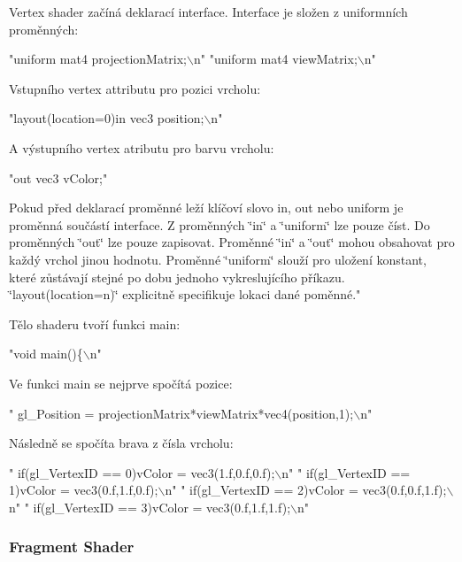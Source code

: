 Vertex shader začíná deklarací interface. Interface je složen z uniformních proměnných\-: 
\begin{DoxyCodeInclude}
\textcolor{stringliteral}{"uniform mat4 projectionMatrix;\(\backslash\)n"}
\textcolor{stringliteral}{"uniform mat4 viewMatrix;\(\backslash\)n"}
\end{DoxyCodeInclude}
Vstupního vertex attributu pro pozici vrcholu\-: 
\begin{DoxyCodeInclude}
\textcolor{stringliteral}{"layout(location=0)in vec3 position;\(\backslash\)n"}
\end{DoxyCodeInclude}
A výstupního vertex atributu pro barvu vrcholu\-: 
\begin{DoxyCodeInclude}
\textcolor{stringliteral}{"out vec3 vColor;"}
\end{DoxyCodeInclude}
Pokud před deklarací proměnné leží klíčoví slovo in, out nebo uniform je proměnná součástí interface. Z proměnných \char`\"{}in\char`\"{} a \char`\"{}uniform\char`\"{} lze pouze číst. Do proměnných \char`\"{}out\char`\"{} lze pouze zapisovat. Proměnné \char`\"{}in\char`\"{} a \char`\"{}out\char`\"{} mohou obsahovat pro každý vrchol jinou hodnotu. Proměnné \char`\"{}uniform\char`\"{} slouží pro uložení konstant, které zůstávají stejné po dobu jednoho vykreslujícího příkazu. \char`\"{}layout(location=n)\char`\"{} explicitně specifikuje lokaci dané poměnné."\par
 Tělo shaderu tvoří funkci main\-: 
\begin{DoxyCodeInclude}
\textcolor{stringliteral}{"void main()\{\(\backslash\)n"}
\end{DoxyCodeInclude}
Ve funkci main se nejprve spočítá pozice\-: 
\begin{DoxyCodeInclude}
\textcolor{stringliteral}{"  gl\_Position = projectionMatrix*viewMatrix*vec4(position,1);\(\backslash\)n"}
\end{DoxyCodeInclude}
Následně se spočíta brava z čísla vrcholu\-: 
\begin{DoxyCodeInclude}
\textcolor{stringliteral}{"  if(gl\_VertexID == 0)vColor = vec3(1.f,0.f,0.f);\(\backslash\)n"}
\textcolor{stringliteral}{"  if(gl\_VertexID == 1)vColor = vec3(0.f,1.f,0.f);\(\backslash\)n"}
\textcolor{stringliteral}{"  if(gl\_VertexID == 2)vColor = vec3(0.f,0.f,1.f);\(\backslash\)n"}
\textcolor{stringliteral}{"  if(gl\_VertexID == 3)vColor = vec3(0.f,1.f,1.f);\(\backslash\)n"}
\end{DoxyCodeInclude}
\hypertarget{triangleExample.c_FragmentShader}{}\subsubsection{Fragment Shader}\label{triangleExample.c_FragmentShader}
